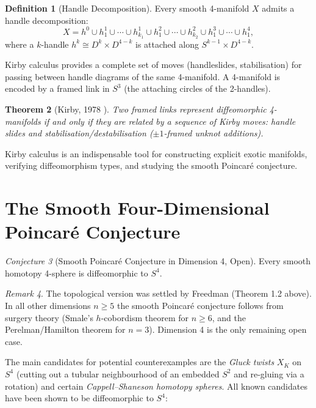 \documentclass[12pt,a4paper]{amsart}
\newtheorem{theorem}{Theorem}[section]
\theoremstyle{definition}
\newtheorem{definition}[theorem]{Definition}
\theoremstyle{remark}
\newtheorem{remark}[theorem]{Remark}
\newtheorem{conjecture}[theorem]{Conjecture}
\begin{document}
\begin{definition}[Handle Decomposition]
Every smooth 4-manifold $X$ admits a handle decomposition:
\[
  X = h^0 \cup h^1_1 \cup \cdots \cup h^1_{k_1}
      \cup h^2_1 \cup \cdots \cup h^2_{k_2}
      \cup h^3_1 \cup \cdots \cup h^4_1,
\]
where a $k$-handle $h^k \cong D^k \times D^{4-k}$ is attached along
$S^{k-1} \times D^{4-k}$.
\end{definition}

Kirby calculus provides a complete set of moves (handleslides, stabilisation)
for passing between handle diagrams of the same 4-manifold.  A 4-manifold is
encoded by a framed link in $S^3$ (the attaching circles of the 2-handles).

\begin{theorem}[Kirby, 1978 \cite{Kirby1978}]
Two framed links represent diffeomorphic 4-manifolds if and only if they
are related by a sequence of Kirby moves: handle slides and
stabilisation/destabilisation ($\pm 1$-framed unknot additions).
\end{theorem}

Kirby calculus is an indispensable tool for constructing explicit exotic
manifolds, verifying diffeomorphism types, and studying the smooth
Poincaré conjecture.

\section{The Smooth Four-Dimensional Poincaré Conjecture}

\begin{conjecture}[Smooth Poincaré Conjecture in Dimension 4, Open]
\label{conj:s4pc}
Every smooth homotopy 4-sphere is diffeomorphic to $S^4$.
\end{conjecture}

\begin{remark}
The topological version was settled by Freedman (Theorem 1.2 above).  In
all other dimensions $n \ge 5$ the smooth Poincaré conjecture follows from
surgery theory (Smale's $h$-cobordism theorem for $n \ge 6$, and the
Perelman/Hamilton theorem for $n = 3$).  Dimension 4 is the only remaining
open case.
\end{remark}

The main candidates for potential counterexamples are the \emph{Gluck
twists} $X_K$ on $S^4$ (cutting out a tubular neighbourhood of an embedded
$S^2$ and re-gluing via a rotation) and certain \emph{Cappell--Shaneson
homotopy spheres}.  All known candidates have been shown to be
diffeomorphic to $S^4$:
\end{document}
